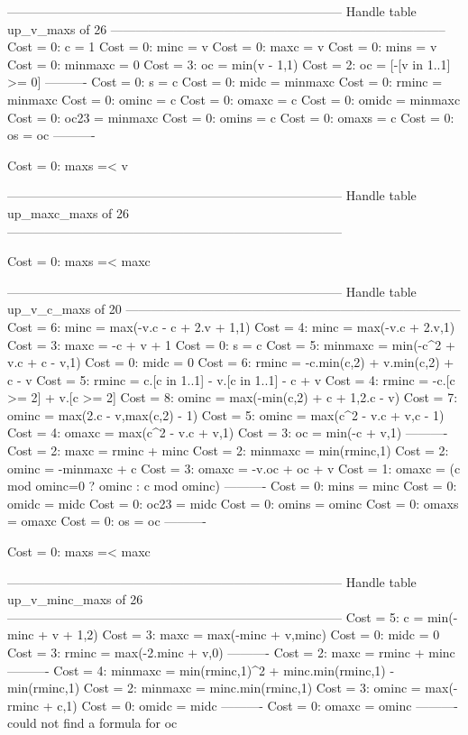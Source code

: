 --------------------------------------------------------------------------------
Handle table up_v_maxs of 26
--------------------------------------------------------------------------------
Cost =  0:  c       = 1
Cost =  0:  minc    = v
Cost =  0:  maxc    = v
Cost =  0:  mins    = v
Cost =  0:  minmaxc = 0
Cost =  3:  oc      = min(v - 1,1)
Cost =  2:  oc      = [-[v in 1..1] >= 0]
----------
Cost =  0:  s       = c
Cost =  0:  midc    = minmaxc
Cost =  0:  rminc   = minmaxc
Cost =  0:  ominc   = c
Cost =  0:  omaxc   = c
Cost =  0:  omidc   = minmaxc
Cost =  0:  oc23    = minmaxc
Cost =  0:  omins   = c
Cost =  0:  omaxs   = c
Cost =  0:  os      = oc
----------

Cost =  0:  maxs =< v

--------------------------------------------------------------------------------
Handle table up_maxc_maxs of 26
--------------------------------------------------------------------------------

Cost =  0:  maxs =< maxc

--------------------------------------------------------------------------------
Handle table up_v_c_maxs of 20
--------------------------------------------------------------------------------
Cost =  6:  minc    = max(-v.c - c + 2.v + 1,1)
Cost =  4:  minc    = max(-v.c + 2.v,1)
Cost =  3:  maxc    = -c + v + 1
Cost =  0:  s       = c
Cost =  5:  minmaxc = min(-c^2 + v.c + c - v,1)
Cost =  0:  midc    = 0
Cost =  6:  rminc   = -c.min(c,2) + v.min(c,2) + c - v
Cost =  5:  rminc   = c.[c in 1..1] - v.[c in 1..1] - c + v
Cost =  4:  rminc   = -c.[c >= 2] + v.[c >= 2]
Cost =  8:  ominc   = max(-min(c,2) + c + 1,2.c - v)
Cost =  7:  ominc   = max(2.c - v,max(c,2) - 1)
Cost =  5:  ominc   = max(c^2 - v.c + v,c - 1)
Cost =  4:  omaxc   = max(c^2 - v.c + v,1)
Cost =  3:  oc      = min(-c + v,1)
----------
Cost =  2:  maxc    = rminc + minc
Cost =  2:  minmaxc = min(rminc,1)
Cost =  2:  ominc   = -minmaxc + c
Cost =  3:  omaxc   = -v.oc + oc + v
Cost =  1:  omaxc   = (c mod ominc=0 ? ominc : c mod ominc)
----------
Cost =  0:  mins    = minc
Cost =  0:  omidc   = midc
Cost =  0:  oc23    = midc
Cost =  0:  omins   = ominc
Cost =  0:  omaxs   = omaxc
Cost =  0:  os      = oc
----------

Cost =  0:  maxs =< maxc

--------------------------------------------------------------------------------
Handle table up_v_minc_maxs of 26
--------------------------------------------------------------------------------
Cost =  5:  c       = min(-minc + v + 1,2)
Cost =  3:  maxc    = max(-minc + v,minc)
Cost =  0:  midc    = 0
Cost =  3:  rminc   = max(-2.minc + v,0)
----------
Cost =  2:  maxc    = rminc + minc
----------
Cost =  4:  minmaxc = min(rminc,1)^2 + minc.min(rminc,1) - min(rminc,1)
Cost =  2:  minmaxc = minc.min(rminc,1)
Cost =  3:  ominc   = max(-rminc + c,1)
Cost =  0:  omidc   = midc
----------
Cost =  0:  omaxc   = ominc
----------
could not find a formula for oc

